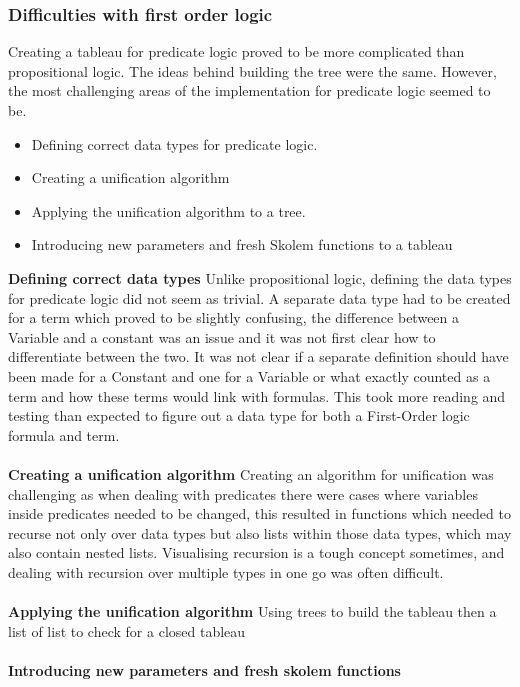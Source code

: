 \documentclass{article}%
\begin{document}
\subsubsection{Difficulties with first order logic}
Creating a tableau for predicate logic proved to be more complicated than propositional logic. The ideas behind building the tree were the same. However, the most challenging areas of the implementation for predicate logic seemed to be. 
\begin{itemize}
\item Defining correct data types for predicate logic.
\item Creating a unification algorithm 
\item Applying the unification algorithm to a tree.
\item Introducing new parameters and fresh Skolem functions to a tableau 
\end{itemize}
\textbf{Defining correct data types} 
Unlike propositional logic, defining the data types for predicate logic did not seem as trivial. A separate data type had to be created for a term which proved to be slightly confusing, the difference between a Variable and a constant was an issue and it was not first clear how to differentiate between the two. It was not clear if a separate definition should have been made for a Constant and one for a Variable or what exactly counted as a term and how these terms would link with formulas. This took more reading and testing than expected to figure out a data type for both a First-Order logic formula and term. \\\\
\textbf{Creating a unification algorithm} Creating an algorithm for unification was challenging as when dealing with predicates there were cases where variables inside predicates needed to be changed, this resulted in functions which needed to recurse not only over data types but also lists within those data types, which may also contain nested lists. Visualising recursion is a tough concept sometimes, and dealing with recursion over multiple types in one go was often difficult.
\\\\
\textbf{Applying the unification algorithm}
Using trees to build the tableau then a list of list to check for a closed tableau \\\\
\textbf{Introducing new parameters and fresh skolem functions}
\end{document}
